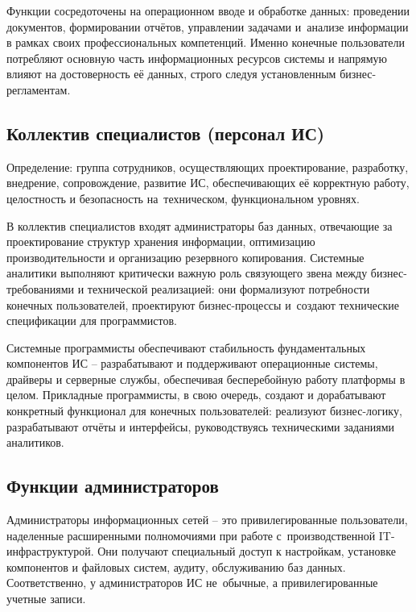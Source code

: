 \documentclass{ou}
\begin{document}
Функции сосредоточены на операционном вводе и обработке данных: проведении документов, формировании отчётов, управлении задачами и~анализе информации в рамках своих профессиональных компетенций. Именно конечные пользователи потребляют основную часть информационных ресурсов системы и напрямую влияют на достоверность её данных, строго следуя установленным бизнес-регламентам\cite{finam_user}.
\subsection{Коллектив специалистов (персонал ИС)}
Определение: группа сотрудников, осуществляющих проектирование, разработку, внедрение, сопровождение, развитие ИС, обеспечивающих её корректную работу, целостность и безопасность на~техническом, функциональном уровнях.

В коллектив специалистов входят администраторы баз данных, отвечающие за проектирование структур хранения информации, оптимизацию производительности и организацию резервного копирования. Системные аналитики выполняют критически важную роль связующего звена между бизнес-требованиями и технической реализацией: они формализуют потребности конечных пользователей, проектируют бизнес-процессы и~создают технические спецификации для программистов.

Системные программисты обеспечивают стабильность фундаментальных компонентов ИС -- разрабатывают и поддерживают операционные системы, драйверы и серверные службы, обеспечивая бесперебойную работу платформы в целом. Прикладные программисты, в свою очередь, создают и дорабатывают конкретный функционал для конечных пользователей: реализуют бизнес-логику, разрабатывают отчёты и интерфейсы, руководствуясь техническими заданиями аналитиков\cite{nag_it}.
\subsection{Функции администраторов}
Администраторы информационных сетей -- это привилегированные пользователи, наделенные расширенными полномочиями при работе с~производственной IT-инфраструктурой. Они получают специальный доступ к настройкам, установке компонентов и файловых систем, аудиту, обслуживанию баз данных. Соответственно, у администраторов ИС не~обычные, а привилегированные учетные записи.
\end{document}
